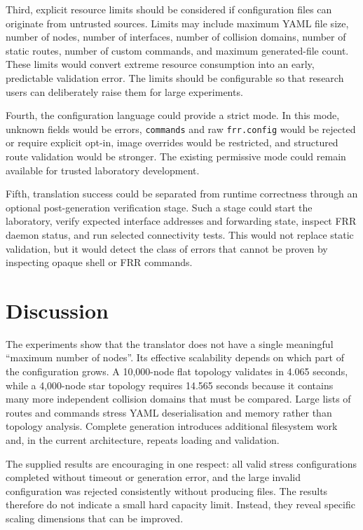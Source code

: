 Third, explicit resource limits should be considered if configuration files
can originate from untrusted sources. Limits may include maximum YAML file
size, number of nodes, number of interfaces, number of collision domains,
number of static routes, number of custom commands, and maximum generated-file
count. These limits would convert extreme resource consumption into an early,
predictable validation error. The limits should be configurable so that
research users can deliberately raise them for large experiments.

Fourth, the configuration language could provide a strict mode. In this mode,
unknown fields would be errors, \texttt{commands} and raw
\texttt{frr.config} would be rejected or require explicit opt-in, image
overrides would be restricted, and structured route validation would be
stronger. The existing permissive mode could remain available for trusted
laboratory development.

Fifth, translation success could be separated from runtime correctness through
an optional post-generation verification stage. Such a stage could start the
laboratory, verify expected interface addresses and forwarding state, inspect
FRR daemon status, and run selected connectivity tests. This would not replace
static validation, but it would detect the class of errors that cannot be
proven by inspecting opaque shell or FRR commands.

\section{Discussion}
\label{sec:security-scalability-discussion}

The experiments show that the translator does not have a single meaningful
``maximum number of nodes''. Its effective scalability depends on which part
of the configuration grows. A 10,000-node flat topology validates in 4.065
seconds, while a 4,000-node star topology requires 14.565 seconds because it
contains many more independent collision domains that must be compared.
Large lists of routes and commands stress YAML deserialisation and memory
rather than topology analysis. Complete generation introduces additional
filesystem work and, in the current architecture, repeats loading and
validation.

The supplied results are encouraging in one respect: all valid stress
configurations completed without timeout or generation error, and the large
invalid configuration was rejected consistently without producing files.
The results therefore do not indicate a small hard capacity limit. Instead,
they reveal specific scaling dimensions that can be improved.

